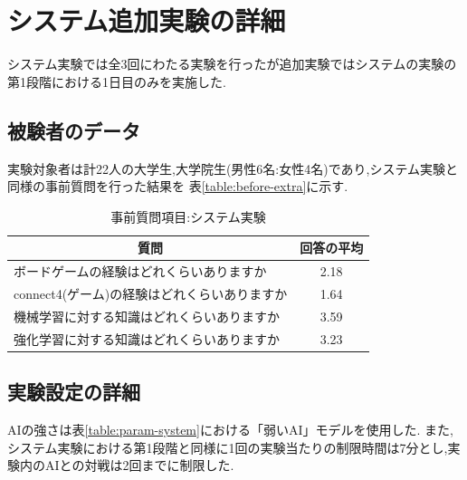 \chapter{システム追加実験の詳細}
\label{chap:system}
システム実験では全3回にわたる実験を行ったが追加実験ではシステムの実験の第1段階における1日目のみを実施した.
\section{被験者のデータ}
実験対象者は計22人の大学生,大学院生(男性6名:女性4名)であり,システム実験と同様の事前質問を行った結果を
表\ref{table:before-extra}に示す.


\begin{table}[H]
    \caption{事前質問項目:システム実験}
    \label{table:before}
	\scriptsize
    \begin{tabular}{l||c}
        \multicolumn{1}{c|}{質問} & 回答の平均\\ \hline \hline
        ボードゲームの経験はどれくらいありますか & 2.18\\
        connect4(ゲーム)の経験はどれくらいありますか& 1.64\\\hline
        機械学習に対する知識はどれくらいありますか& 3.59\\
        強化学習に対する知識はどれくらいありますか& 3.23\\
    \end{tabular}
    
\end{table}
\section{実験設定の詳細}
AIの強さは表\ref{table:param-system}における「弱いAI」モデルを使用した.
また,システム実験における第1段階と同様に1回の実験当たりの制限時間は7分とし,実験内のAIとの対戦は2回までに制限した.


